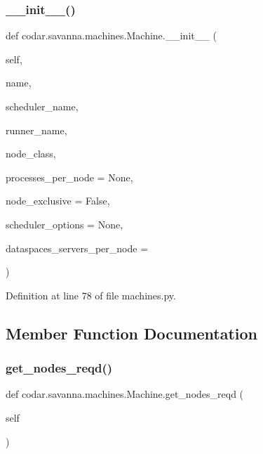 \subsubsection{\texorpdfstring{\+\_\+\+\_\+init\+\_\+\+\_\+()}{\_\_init\_\_()}}
{\footnotesize\ttfamily def codar.\+savanna.\+machines.\+Machine.\+\_\+\+\_\+init\+\_\+\+\_\+ (\begin{DoxyParamCaption}\item[{}]{self,  }\item[{}]{name,  }\item[{}]{scheduler\+\_\+name,  }\item[{}]{runner\+\_\+name,  }\item[{}]{node\+\_\+class,  }\item[{}]{processes\+\_\+per\+\_\+node = {\ttfamily None},  }\item[{}]{node\+\_\+exclusive = {\ttfamily False},  }\item[{}]{scheduler\+\_\+options = {\ttfamily None},  }\item[{}]{dataspaces\+\_\+servers\+\_\+per\+\_\+node = {} }\end{DoxyParamCaption})}



Definition at line 78 of file machines.\+py.



\subsection{Member Function Documentation}
\mbox{\label{classcodar_1_1savanna_1_1machines_1_1_machine_a13cd507ffb654ef95477f9cd22de6691}} 
\subsubsection{\texorpdfstring{get\+\_\+nodes\+\_\+reqd()}{get\_nodes\_reqd()}}
{\footnotesize\ttfamily def codar.\+savanna.\+machines.\+Machine.\+get\+\_\+nodes\+\_\+reqd (\begin{DoxyParamCaption}\item[{}]{self }\end{DoxyParamCaption})}



